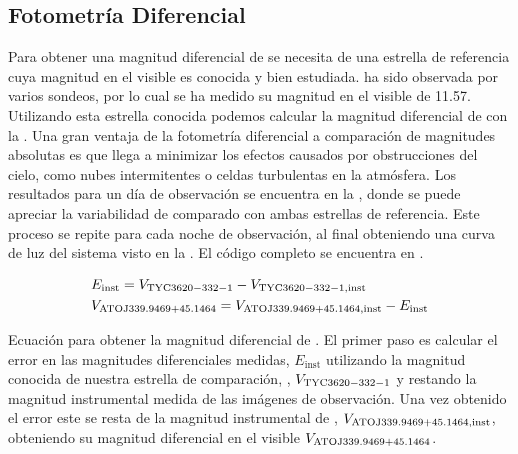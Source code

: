 \subsection{Fotometría Diferencial}
Para obtener una magnitud diferencial de \atoObjId se necesita de una estrella
de referencia cuya magnitud en el visible es conocida y bien estudiada.
\compstarId ha sido observada por varios sondeos, por lo cual se ha medido su
magnitud en el visible de 11.57. Utilizando esta estrella conocida podemos
calcular la magnitud diferencial de \atoObjId con la . Una gran ventaja de
la fotometría diferencial a comparación de magnitudes absolutas es que llega a
minimizar los efectos causados por obstrucciones del cielo, como nubes
intermitentes o celdas turbulentas en la atmósfera. Los resultados para un día
de observación se encuentra en la , donde se
puede apreciar la variabilidad de \atoObjId comparado con ambas estrellas de
referencia. Este proceso se repite para cada noche de observación, al final
obteniendo una curva de luz del sistema visto en la
. El código completo se encuentra en
\href{https://github.com/KnightIV/UANL_MAPTA_Observaciones/blob/main/analisis/iturbide/iraf/qphot_sigma_clip.ipynb}{}.

\begin{eqfloat}[!ht]
	\begin{equation} \label{observaciones:fotometriadiferencial:magdiferencialec}
		\begin{split}
			& E_{\mathrm{inst}} = V_{\mathrm{TYC 3620-332-1}} - V_{\mathrm{TYC 3620-332-1}, \mathrm{inst}} \\
			& V_{\mathrm{ATO J339.9469+45.1464 \space}} = V_{\mathrm{ATO J339.9469+45.1464 \space}, \mathrm{inst}} - E_{\mathrm{inst}}
		\end{split}
	\end{equation}
	\caption{Ecuación para obtener la magnitud diferencial de \atoObjIdNoSpace.
	El primer paso es calcular el error en las magnitudes diferenciales medidas,
	$E_{\mathrm{inst}}$ utilizando la magnitud conocida de nuestra estrella de
	comparación, \compstarIdNoSpace, $ V_{\mathrm{TYC 3620-332-1}}$ y
	restando la magnitud instrumental medida de las imágenes de observación. Una
	vez obtenido el error este se resta de la magnitud instrumental de
	\atoObjIdNoSpace, $V_{\mathrm{ATO J339.9469+45.1464 \space}, \mathrm{inst}}$, obteniendo su
	magnitud diferencial en el visible $V_{\mathrm{ATO J339.9469+45.1464 \space}}$.}
\end{eqfloat}
	
